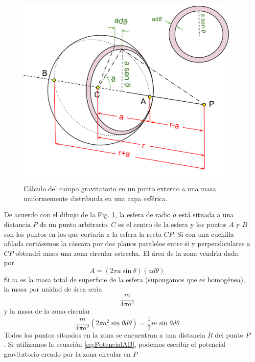 \begin{figure}[h]
  \includegraphics[width=\linewidth]{EsferaGravedad.pdf}
  \caption{C\'alculo del campo gravitatorio en un punto externo a una masa uniformemente distribuida en una capa esf\'erica.}
  \label{fig:EsferaGravedad}
\end{figure}

De acuerdo con el dibujo de la Fig. \ref{fig:EsferaGravedad}, la esfera de radio $a$ est\'a situada a una distancia $P$ de un punto arbitrario. $C$ es el centro de la esfera y los puntos $A$ y $B$ son los puntos en los que cortar\'\i{}a a la  esfera la recta $CP$. Si con una cuchilla afilada cort\'asemos la c\'ascara por dos planos paralelos entre s\'\i{}  y perpendiculares a $CP$ obtendr\'\i{} amos una zona circular estrecha. El \'area de la zona vendr\'\i{}a dada por
\begin{equation}
A= (2 \pi a \sin \theta)(a d\theta)
\label{eq:area_zona_circular}
\end{equation}
Si $m$ es la masa total de superficie de la esfera (supongamos que es homog\'enea), la masa por unidad de \'area ser\'\i{}a
\begin{equation}
\frac{m}{4 \pi a^2}
\label{eq:masa_area}
\end{equation}
y la masa de la zona circular 
\begin{equation}
\frac{m}{4 \pi a^2}(2 \pi a^2 \sin \theta d \theta)=\frac{1}{2}m \sin \theta d \theta
\label{eq:masa_area_circular}
\end{equation}
Todos los puntos situados en la zona se encuentran a una distancia $R$ del punto $P$. Si utilizamos la ecuaci\'on \ref{eq:PotencialAB}, podemos escribir el potencial gravitatorio creado por la zona circular en $P$

